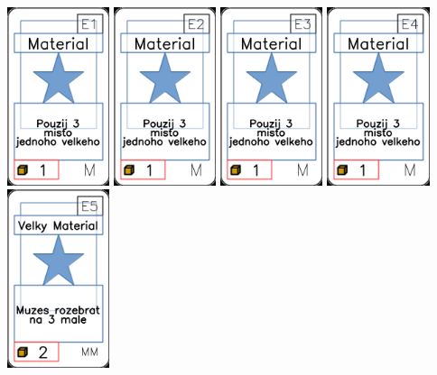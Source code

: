 \documentclass[a4paper]{article}
\begin{document}
	\includegraphics[width=3.0cm]{img-1_50}
	\includegraphics[width=3.0cm]{img-1_51}
	\includegraphics[width=3.0cm]{img-1_52}
	\includegraphics[width=3.0cm]{img-1_53}
	\includegraphics[width=3.0cm]{img-1_54}
\end{document}
